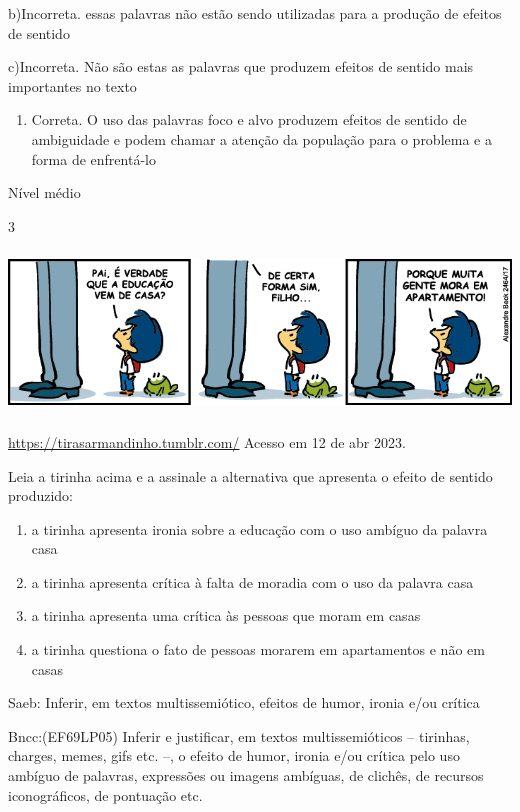 {b)Incorreta. essas palavras não estão sendo utilizadas para a produção
de efeitos de sentido

c)Incorreta. Não são estas as palavras que produzem efeitos de sentido
mais importantes no texto

\begin{enumerate}
\def\labelenumi{\arabic{enumi}.}
\tightlist
\item
  Correta. O uso das palavras foco e alvo produzem efeitos de sentido de
  ambiguidade e podem chamar a atenção da população para o problema e a
  forma de enfrentá-lo
\end{enumerate}

Nível médio

\num{3}

\includegraphics[width=5.90551in,height=1.70833in]{./imgSAEB_7_POR/media/image7.png}

\href{https://tirasarmandinho.tumblr.com/}{\uline{https://tirasarmandinho.tumblr.com/}}
Acesso em 12 de abr 2023.

Leia a tirinha acima e a assinale a alternativa que apresenta o efeito
de sentido produzido:

\begin{enumerate}
\def\labelenumi{\alph{enumi})}
\item
  a tirinha apresenta ironia sobre a educação com o uso ambíguo da
  palavra casa
\item
  a tirinha apresenta crítica à falta de moradia com o uso da palavra
  casa
\item
  a tirinha apresenta uma crítica às pessoas que moram em casas
\item
  a tirinha questiona o fato de pessoas morarem em apartamentos e não em
  casas
\end{enumerate}

Saeb: Inferir, em textos multissemiótico, efeitos de humor, ironia e/ou
crítica

Bncc:(EF69LP05) Inferir e justificar, em textos multissemióticos --
tirinhas, charges, memes, gifs etc. --, o efeito de humor, ironia e/ou
crítica pelo uso ambíguo de palavras, expressões ou imagens ambíguas, de
clichês, de recursos iconográficos, de pontuação etc.

}
